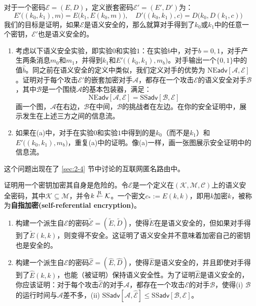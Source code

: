 \begin{exercise}[嵌套加密]\label{exer:2-15}
对于一个密码$\mathcal{E}=(E,D)$，定义嵌套密码$\mathcal{E}'=(E',D')$为：
\[
E'\big((k_0,k_1),m\big)=E\big(k_1,E(k_0,m)\big),\quad
D'\big((k_0,k_1),c\big)=D\big(k_0,D(k_1,c)\big)
\]
我们的目标是证明，如果$\mathcal{E}$是语义安全的，那么就算对手得到了$k_0$或$k_1$中的任意一个密钥，$\mathcal{E}'$也是语义安全的。
\begin{enumerate}[\indent(a)]
	\item 考虑以下语义安全实验，即实验$0$和实验$1$：在实验$b$中，对于$b=0,1$，对手产生两条消息$m_0$和$m_1$，并得到$k_1$和$E'\big((k_0,k_1),m_b\big)$。对手输出一个$\{0,1\}$中的值$\hat b$。同之前在语义安全的定义中类似，我们定义对手的优势为 $\mathrm{NE}\mathsf{adv}[\mathcal{A},\mathcal{E}]$。证明对于每个攻击$\mathcal{E}'$的嵌套加密对手$\mathcal{A}$，都存在一个攻击$\mathcal{E}$的语义安全对手$\mathcal{B}$，其中$\mathcal{B}$是一个围绕$\mathcal{A}$的基本包装器，满足：
	\[
	\mathrm{NE}\mathsf{adv}[\mathcal{A},\mathcal{E}]=\mathrm{SS}\mathsf{adv}[\mathcal{B},\mathcal{E}]
	\]
	画一个图，$\mathcal{A}$在右边，$\mathcal{B}$在中间，$\mathcal{B}$的挑战者在左边。在你的安全证明中，展示发生在上述三方之间的信息流。
	\item 如果在(a)中，对手在实验$0$和实验$1$中得到的是$k_0$（而不是$k_1$）和$E'\big((k_0,k_1),m_b\big)$，重复(a)中的证明。像(a)一样，画一张图展示安全证明中的信息流。
\end{enumerate}
这个问题出现在了 \ref{sec:2-4} 节中讨论的互联网匿名路由中。
\end{exercise}

\begin{exercise}[自指加密]
证明用一个密钥加密其自身是危险的。令$\mathcal{E}$是一个定义在$(\mathcal{K},\mathcal{M},\mathcal{C})$上的语义安全密码，其中$\mathcal{K}\subseteq\mathcal{M}$，并令$k\overset{\rm R}\leftarrow\mathcal{K}$。一个密文$c_*:=E(k,k)$，即用$k$加密$k$，被称为\textbf{自指加密(self-referential encryption)}。
\begin{enumerate}[\indent(a)]
	\item 构建一个派生自$\mathcal{E}$的密码$\mathcal{\tilde{E}}=(\tilde{E},\tilde{D})$，使得$\tilde{E}$在是语义安全的，但如果对手得到了$\tilde{E}(k,k)$，则变得不安全。这证明了语义安全并不意味着加密自己的密钥也是安全的。
	\item 构建一个派生自$\mathcal{E}$的密码$\mathcal{\hat{E}}=(\hat{E},\hat{D})$，使得$\hat{E}$是语义安全的，并且即使对手得到了$\hat{E}(k,k)$，也能（被证明）保持语义安全性。为了证明$\hat{E}$是语义安全的，你应该证明：对于每个攻击$\mathcal{\hat{E}}$的对手$\mathcal{A}$，都存在一个攻击$\mathcal{E}$的对手$\mathcal{B}$，使得(i) $\mathcal{B}$的运行时间与$\mathcal{A}$差不多，(ii) $\mathrm{SS}\mathsf{adv}[\mathcal{A},\mathcal{\hat{E}}]\leq\mathrm{SS}\mathsf{adv}[\mathcal{B},\mathcal{E}]$。
\end{enumerate}
\end{exercise}

